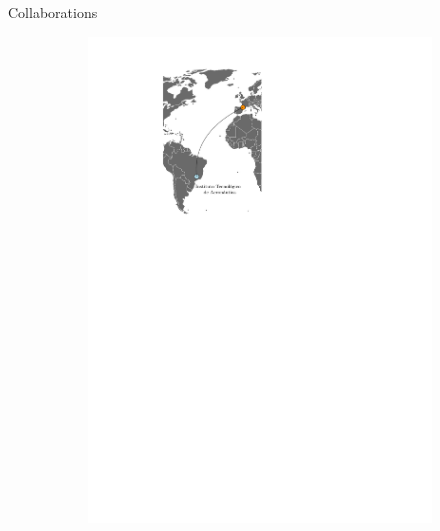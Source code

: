 \documentclass[aspectratio=169, french]{beamer}
\begin{document}
\begin{frame}{Collaborations}
\begin{figure}[t]
\begin{subfigure}{0.4\textwidth}
		\includegraphics[width=.9\textwidth]{mappe_reseau_world.pdf} 
	\end{subfigure}
\end{figure}
\end{frame}

	
\end{document}
